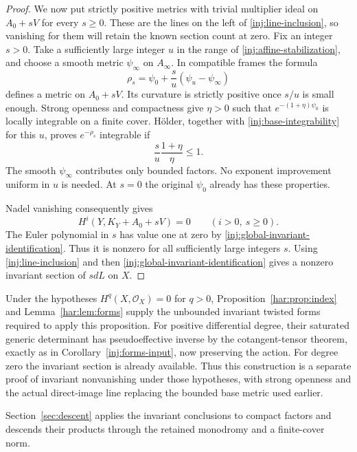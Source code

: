 \begin{proof}
We now put strictly positive metrics with trivial multiplier ideal
on $A_0+sV$ for every $s\ge0$. These are the lines on the left of
\eqref{inj:line-inclusion}, so vanishing for them will retain the
known section count at zero. Fix an integer $s>0$. Take a sufficiently
large integer $u$ in
the range of \eqref{inj:affine-stabilization}, and choose a smooth
metric $\psi_\infty$ on $A_\infty$.  In compatible frames the
formula
\begin{equation}\label{inj:openness-mixture}
 \rho_s=\psi_0+\frac{s}{u}(\psi_u-\psi_\infty)
\end{equation}
defines a metric on $A_0+sV$.  Its curvature is strictly positive
once $s/u$ is small enough.  Strong openness
\cite[Theorem 1.1]{GuanZhou2015} and compactness give
$\eta>0$ such that $e^{-(1+\eta)\psi_0}$ is locally
integrable on a finite cover.  H\"older, together with
\eqref{inj:base-integrability} for this $u$, proves
$e^{-\rho_s}$ integrable if
\[
 \frac{s}{u}\frac{1+\eta}{\eta}\le1.
\]
The smooth $\psi_\infty$ contributes only bounded factors.
No exponent improvement uniform in $u$ is needed.  At $s=0$
the original $\psi_0$ already has these properties.

Nadel vanishing consequently gives
\[
 H^i(Y,K_Y+A_0+sV)=0\qquad(i>0,\ s\ge0).
\]
The Euler polynomial in $s$ has value one at zero by
\eqref{inj:global-invariant-identification}.  Thus it is nonzero
for all sufficiently large integers $s$.  Using
\eqref{inj:line-inclusion} and then
\eqref{inj:global-invariant-identification} gives a nonzero
invariant section of $sdL$ on $X$.
\end{proof}

Under the hypotheses $H^q(X,\mathcal O_X)=0$ for $q>0$,
Proposition~\ref{har:prop:index} and Lemma~\ref{har:lem:forms} supply the
unbounded invariant twisted forms required to apply this proposition.
For positive differential degree, their saturated generic determinant
has pseudoeffective inverse by the cotangent-tensor theorem, exactly
as in Corollary~\ref{inj:forms-input}, now preserving the action.
For degree zero the invariant section is already available.  Thus
this construction is a separate proof of invariant nonvanishing
under those hypotheses, with strong openness and the actual
direct-image line replacing the bounded base metric used earlier.

Section~\ref{sec:descent} applies the invariant conclusions to compact
factors and descends their products through the retained monodromy
and a finite-cover norm.

